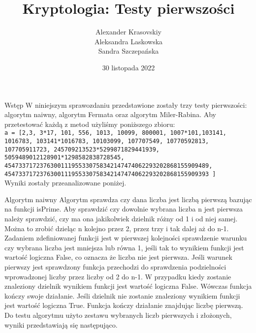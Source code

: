 \documentclass[11pt]{article}
\title{Kryptologia: Testy pierwszości}
\author{Alexander Krasovskiy \\ Aleksandra Laskowska \\ Sandra Szczepańska}
\date{30 listopada 2022}
\begin{document}
    
    \maketitle
 \begin{section}{Wstęp}
    W niniejszym sprawozdaniu przedstawione zostały trzy testy pierwszości: algorytm naiwny, algorytm Fermata oraz algorytm Miler-Rabina. Aby przetestować każdą z metod użyliśmy poniższego zbioru: \\
    \texttt{a = [2,3, 3*17, 101, 556, 1013, 10099, 800001, 1007*101,103141, 
     1016783, 103141*1016783, 10103099, 107707549, 10770592813, 
     107705911723, 245709213523*5299871829441939, 
     5059489012128901*1298582838728545,
    4547337172376300111955330758342147474062293202868155909489,
    4547337172376300111955330758342147474062293202868155909393
    ]} \\
    Wyniki zostały przeanalizowane poniżej.
\end{section}   
    \begin{section}{Algorytm naiwny}
    Algorytm sprawdza czy dana liczba jest liczbą pierwszą bazując na funkcji isPrime. Aby sprawdzić czy dowolnie wybrana liczba n jest pierwsza należy sprawdzić, czy ma ona jakikolwiek dzielnik różny od 1 i od niej samej. Można to zrobić dzieląc n kolejno przez 2, przez trzy i tak dalej aż do n-1. Zadaniem zdefiniowanej funkcji jest w pierwszej kolejności sprawdzenie warunku czy wybrana liczba jest mniejsza lub równa 1, jeśli tak to wynikiem funkcji jest wartość logiczna False, co oznacza że liczba nie jest pierwsza. Jeśli warunek pierwszy jest sprawdzony funkcja przechodzi do sprawdzenia podzielności wprowadzonej liczby przez liczby od 2 do n-1. W przypadku kiedy zostanie znaleziony dzielnik wynikiem funkcji jest wartość logiczna False. Wówczas funkcja kończy swoje działanie. Jeśli dzielnik nie zostanie znaleziony wynikiem funkcji jest wartość logiczna True. Funkcja kończy działanie znajdując liczbę pierwszą. \\
    Do testu algorytmu użyto zestawu wybranych liczb pierwszych i złożonych, wyniki przedstawiają się następująco. 
\end{section}
\end{document}
